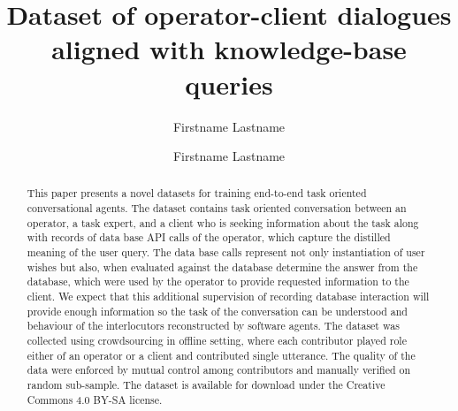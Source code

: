 \documentclass[runningheads,a4paper]{llncs}
\begin{document}


\title{Dataset of operator-client dialogues aligned with knowledge-base queries}


%
\iftrue %
\author{Firstname Lastname \and Firstname Lastname }

\fi
			
\maketitle

\begin{abstract}
    This paper presents a novel datasets for training end-to-end task oriented conversational agents.
    The dataset contains task oriented conversation between an operator, a task expert, and a client who is seeking information about the task along with records of data base API calls of the operator, which capture the distilled meaning of the user query.
    The data base calls represent not only instantiation of user wishes but also, when evaluated against the database determine the answer from the database, which were used by the operator to provide requested information to the client. 
    We expect that this additional supervision of recording database interaction will provide enough information so the task of the conversation can be understood and behaviour of the interlocutors reconstructed by software agents.
    The dataset was collected using crowdsourcing in offline setting, where each contributor played role either of an operator or a client and contributed single utterance.
    The quality of the data were enforced by mutual control among contributors and manually verified on random sub-sample.
    The dataset is available for download under the Creative Commons 4.0 BY-SA license.
\end{abstract}
\end{document}
